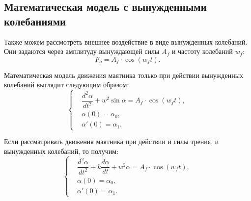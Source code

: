 	\subsection{Математическая модель с вынужденными колебаниями}
		Также можем рассмотреть внешнее воздействие в виде вынужденных колебаний. Они задаются через амплитуду вынуждающей силы \( A_f \) и частоту колебаний \( w_f \):
		\begin{equation}
			F_o = A_f \cdot \cos(w_f t).
		\end{equation}

		Математическая модель движения маятника только при действии вынужденных колебаний выглядит следующим образом:
		\begin{equation}
			\begin{cases}
				& \dfrac{d^2 \alpha}{dt^2} + w^2 \sin \alpha = A_f \cdot \cos(w_f t), \\
				& \alpha(0) = \alpha_0, \\
				& \alpha'(0) = \alpha_1.
			\end{cases}
		\end{equation}

	Если рассматривать движения маятника при действии и силы трения, и вынужденных колебаний, то получим:
	\begin{equation}
			\begin{cases}
				& \dfrac{d^2 \alpha}{dt^2} +  k \dfrac{d \alpha}{dt} + w^2  \alpha = A_f \cdot \cos(w_f t), \\
				& \alpha(0) = \alpha_0, \\
				& \alpha'(0) = \alpha_1.
			\end{cases}
		\end{equation}


\pagebreak
